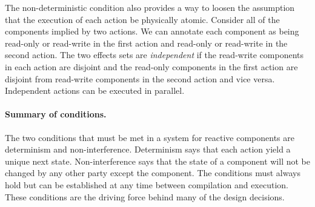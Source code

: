 
The non-deterministic condition also provides a way to loosen the assumption that the execution of each action be physically atomic.
Consider all of the components implied by two actions.
We can annotate each component as being read-only or read-write in the first action and read-only or read-write in the second action.
The two effects sets are \emph{independent} if the read-write components in each action are disjoint and the read-only components in the first action are disjoint from read-write components in the second action and vice versa.
Independent actions can be executed in parallel.

\paragraph{Summary of conditions.}
The two conditions that must be met in a system for reactive components are determinism and non-interference.
Determinism says that each action yield a unique next state.
Non-interference says that the state of a component will not be changed by any other party except the component.
The conditions must always hold but can be established at any time between compilation and execution.
These conditions are the driving force behind many of the design decisions.
